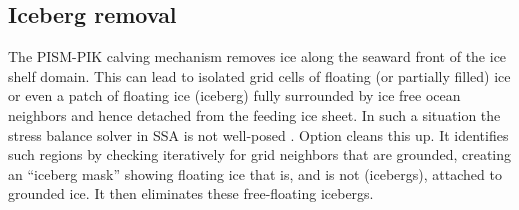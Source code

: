 \subsection{Iceberg removal}
\label{sec:kill-icebergs}
The PISM-PIK calving mechanism removes ice along the seaward front of the ice shelf domain. This can lead to isolated grid cells of floating (or partially filled) ice or even a patch of floating ice (iceberg) fully surrounded by ice free ocean neighbors and hence detached from the feeding ice sheet. In such a situation the stress balance solver in SSA is not well-posed \cite{SchoofStream}. Option  cleans this up.  It identifies such regions by checking iteratively for grid neighbors that are grounded, creating an ``iceberg mask'' showing floating ice that is, and is not (icebergs), attached to grounded ice.  It then eliminates these free-floating icebergs.



